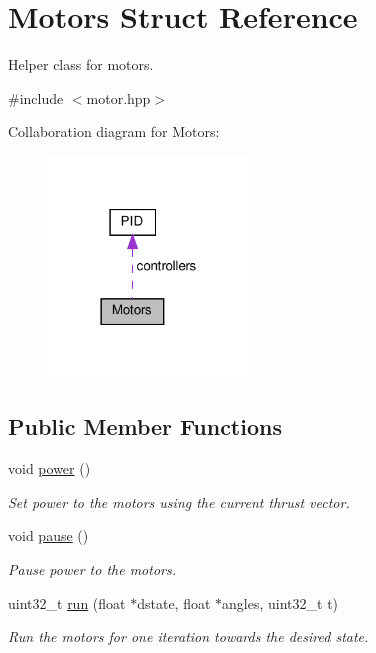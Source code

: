\hypertarget{structMotors}{}\section{Motors Struct Reference}
\label{structMotors}


Helper class for motors.  




{\ttfamily \#include $<$motor.\+hpp$>$}



Collaboration diagram for Motors\+:
\nopagebreak
\begin{figure}[H]
\begin{center}
\leavevmode
\includegraphics[width=153pt]{structMotors__coll__graph}
\end{center}
\end{figure}
\subsection*{Public Member Functions}
\begin{DoxyCompactItemize}
\item 
\mbox{\label{structMotors_ac6532a754e5f1743ee4975b6722b4054}} 
void \hyperlink{structMotors_ac6532a754e5f1743ee4975b6722b4054}{power} ()
\begin{DoxyCompactList}\small\item\em Set power to the motors using the current thrust vector. \end{DoxyCompactList}\item 
\mbox{\label{structMotors_a179c6a24115935994a13493f74f56df8}} 
void \hyperlink{structMotors_a179c6a24115935994a13493f74f56df8}{pause} ()
\begin{DoxyCompactList}\small\item\em Pause power to the motors. \end{DoxyCompactList}\item 
uint32\+\_\+t \hyperlink{structMotors_a0d3909ec9fadbb3028368e7340a2e707}{run} (float $\ast$dstate, float $\ast$angles, uint32\+\_\+t t)
\begin{DoxyCompactList}\small\item\em Run the motors for one iteration towards the desired state. \end{DoxyCompactList}\end{DoxyCompactItemize}
